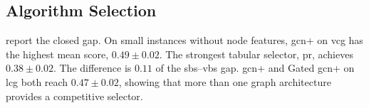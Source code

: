 \subsection{Algorithm Selection}
\label{sec:ch07:selection-results}
 report the closed gap. On small instances without node features, \gls{gcn}+ on \gls{vcg} has the highest mean score, $0.49\pm0.02$. The strongest tabular selector, \gls{pr}, achieves $0.38\pm0.02$. The difference is $0.11$ of the \gls{sbs}--\gls{vbs} gap. \gls{gcn}+ and Gated \gls{gcn}+ on \gls{lcg} both reach $0.47\pm0.02$, showing that more than one graph architecture provides a competitive selector.

\begin{table}[htbp]
\caption[Algorithm selection on small  instances without node features]{Algorithm selection results on  \gls{sat} instances without node features (gap closed; mean and sample standard deviation over three seeds; higher is better). Tabular baselines are shown for all three nested size regimes and are shared across the two node-feature conditions.}
\label{tab:ch07:sat_as_res_no_feat}

  \tabledefaults
  \centering



\end{table}
